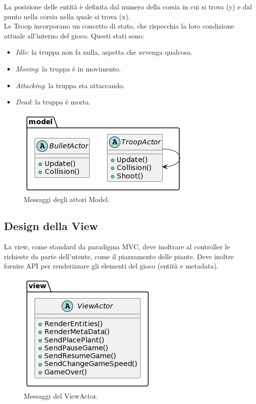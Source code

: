 La posizione delle entità è definita dal numero della corsia in cui si trova (y) e dal punto nella corsia nella quale si trova (x).\\

Le Troop incorporano un concetto di stato, che rispecchia la loro condizione attuale all'interno del gioco. Questi stati sono:
\begin{itemize}
    \item \textit{Idle}: la truppa non fa nulla, aspetta che avvenga qualcosa.
    \item \textit{Moving}: la truppa è in movimento.
    \item \textit{Attacking}: la truppa sta attaccando.
    \item \textit{Dead}: la truppa è morta.
\end{itemize}

\begin{figure}[H]
    \centering
    \includegraphics[width=0.61\linewidth]{images/detail-model.png}
    \caption{Messaggi degli attori Model.}
\end{figure}

\newpage

\subsection{Design della View}
La view, come standard da paradigma MVC, deve inoltrare al controller le richieste da parte dell'utente,
come il piazzamento delle piante.
Deve inoltre fornire API per renderizzare gli elementi del gioco (entità e metadata).

\begin{figure}[H]
    \centering
    \includegraphics[width=0.61\linewidth]{images/detail-view.png}
    \caption{Messaggi del ViewActor.}
\end{figure}

